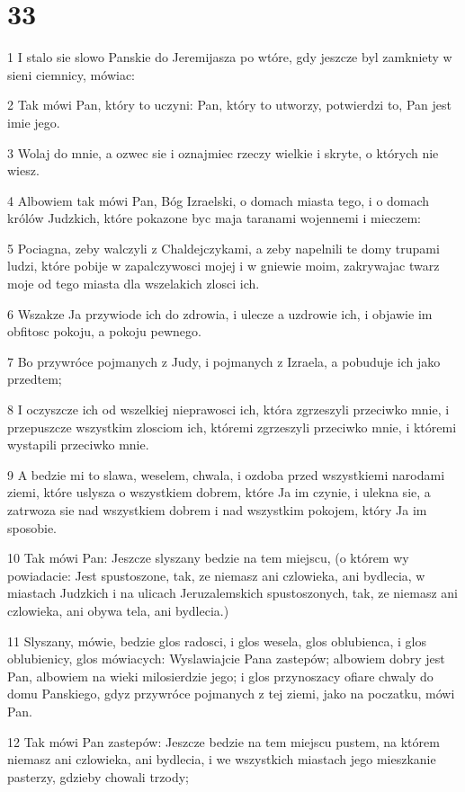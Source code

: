 \chapter{33}

\par 1 I stalo sie slowo Panskie do Jeremijasza po wtóre, gdy jeszcze byl zamkniety w sieni ciemnicy, mówiac:
\par 2 Tak mówi Pan, który to uczyni: Pan, który to utworzy, potwierdzi to, Pan jest imie jego.
\par 3 Wolaj do mnie, a ozwec sie i oznajmiec rzeczy wielkie i skryte, o których nie wiesz.
\par 4 Albowiem tak mówi Pan, Bóg Izraelski, o domach miasta tego, i o domach królów Judzkich, które pokazone byc maja taranami wojennemi i mieczem:
\par 5 Pociagna, zeby walczyli z Chaldejczykami, a zeby napelnili te domy trupami ludzi, które pobije w zapalczywosci mojej i w gniewie moim, zakrywajac twarz moje od tego miasta dla wszelakich zlosci ich.
\par 6 Wszakze Ja przywiode ich do zdrowia, i ulecze a uzdrowie ich, i objawie im obfitosc pokoju, a pokoju pewnego.
\par 7 Bo przywróce pojmanych z Judy, i pojmanych z Izraela, a pobuduje ich jako przedtem;
\par 8 I oczyszcze ich od wszelkiej nieprawosci ich, która zgrzeszyli przeciwko mnie, i przepuszcze wszystkim zlosciom ich, któremi zgrzeszyli przeciwko mnie, i któremi wystapili przeciwko mnie.
\par 9 A bedzie mi to slawa, weselem, chwala, i ozdoba przed wszystkiemi narodami ziemi, które uslysza o wszystkiem dobrem, które Ja im czynie, i ulekna sie, a zatrwoza sie nad wszystkiem dobrem i nad wszystkim pokojem, który Ja im sposobie.
\par 10 Tak mówi Pan: Jeszcze slyszany bedzie na tem miejscu, (o którem wy powiadacie: Jest spustoszone, tak, ze niemasz ani czlowieka, ani bydlecia, w miastach Judzkich i na ulicach Jeruzalemskich spustoszonych, tak, ze niemasz ani czlowieka, ani obywa tela, ani bydlecia.)
\par 11 Slyszany, mówie, bedzie glos radosci, i glos wesela, glos oblubienca, i glos oblubienicy, glos mówiacych: Wyslawiajcie Pana zastepów; albowiem dobry jest Pan, albowiem na wieki milosierdzie jego; i glos przynoszacy ofiare chwaly do domu Panskiego, gdyz przywróce pojmanych z tej ziemi, jako na poczatku, mówi Pan.
\par 12 Tak mówi Pan zastepów: Jeszcze bedzie na tem miejscu pustem, na którem niemasz ani czlowieka, ani bydlecia, i we wszystkich miastach jego mieszkanie pasterzy, gdzieby chowali trzody;
